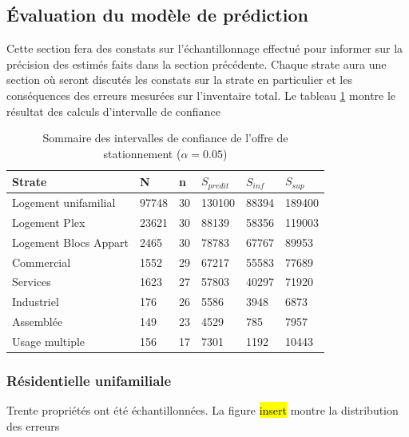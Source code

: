 \subsection{Évaluation du modèle de prédiction}\label{ssec:eval-park-pred-perf}
Cette section fera des constats sur l'échantillonnage effectué pour informer sur la précision des estimés faits dans la section précédente. Chaque strate aura une section où seront discutés les constats sur la strate en particulier et les conséquences des erreurs mesurées sur l'inventaire total. Le tableau \ref{tab:confidence-interval-parking-supply} montre le résultat des calculs d'intervalle de confiance
\begin{table}[h]
    \centering
    \caption{Sommaire des intervalles de confiance de l'offre de stationnement ($\alpha=0.05$)}
    \label{tab:confidence-interval-parking-supply}
    \begin{tabular}{llllll}
        \hline
        Strate                  & N     & n     & $S_{predit}$  & $S_{inf}$    & $S_{sup}$  \\ \hline
        Logement unifamilial    & 97748 & 30    & 130100        & 88394         & 189400        \\
        Logement Plex           & 23621 & 30    & 88139         & 58356         & 119003        \\
        Logement Blocs Appart   & 2465  & 30    & 78783         & 67767         & 89953         \\
        Commercial              & 1552  & 29    & 67217         & 55583         & 77689         \\
        Services                & 1623  & 27    & 57803         & 40297         & 71920         \\
        Industriel              & 176   & 26    & 5586          & 3948          & 6873          \\
        Assemblée               & 149   & 23    & 4529          & 785           & 7957          \\
        Usage multiple          & 156   & 17    & 7301          & 1192          & 10443         \\
        \hline
    \end{tabular}
    
\end{table}
\FloatBarrier
\subsubsection{Résidentielle unifamiliale}
Trente propriétés ont été échantillonnées.  La figure \hl{insert} montre la distribution des erreurs 
